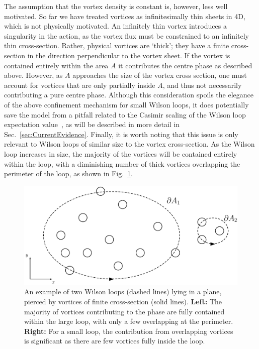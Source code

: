 The assumption that the vortex density is constant is, however, less well motivated. So far we have treated vortices as infinitesimally thin sheets in 4D, which is not physically motivated. An infinitely thin vortex introduces a singularity in the action, as the vortex flux must be constrained to an infinitely thin cross-section. Rather, physical vortices are `thick'; they have a finite cross-section in the direction perpendicular to the vortex sheet. If the vortex is contained entirely within the area $A$ it contributes the centre phase as described above. However, as $A$ approaches the size of the vortex cross section, one must account for vortices that are only partially inside $A$, and thus not necessarily contributing a pure centre phase. Although this consideration spoils the elegance of the above confinement mechanism for small Wilson loops, it does potentially save the model from a pitfall related to the Casimir scaling of the Wilson loop expectation value~\cite{Greensite:1982be,Faber:1997rp}, as will be described in more detail in Sec.~\ref{sec:CurrentEvidence}. Finally, it is worth noting that this issue is only relevant to Wilson loops of similar size to the vortex cross-section. As the Wilson loop increases in size, the majority of the vortices will be contained entirely within the loop, with a diminishing number of thick vortices overlapping the perimeter of the loop, as shown in Fig.~\ref{fig:VortexSizes}.\\
%
\begin{figure}[htb!]
\centering
\includegraphics[width=\linewidth]{./LargeVortex.pdf}
\caption[An example of two Wilson loops lying in a plane, pierced by vortices of finite cross-section.]{\label{fig:VortexSizes}An example of two Wilson loops (dashed lines) lying in a plane, pierced by vortices of finite cross-section (solid lines). \textbf{Left:} The majority of vortices contributing to the phase are fully contained within the large loop, with only a few overlapping at the perimeter. \textbf{Right:} For a small loop, the contribution from overlapping vortices is significant as there are few vortices fully inside the loop.}
\end{figure}

